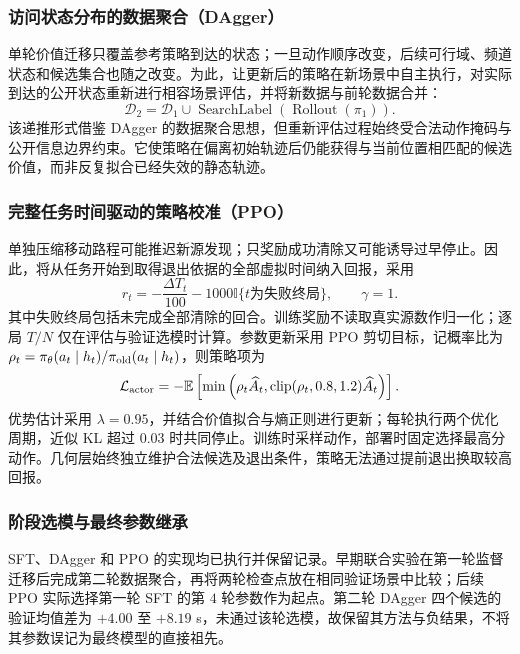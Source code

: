\subsubsection{访问状态分布的数据聚合（DAgger）}
单轮价值迁移只覆盖参考策略到达的状态；一旦动作顺序改变，后续可行域、频道状态和候选集合也随之改变。为此，让更新后的策略在新场景中自主执行，对实际到达的公开状态重新进行相容场景评估，并将新数据与前轮数据合并：
\begin{equation}
  \mathcal D_2=\mathcal D_1\cup
  \operatorname{SearchLabel}\!\left(\operatorname{Rollout}(\pi_1)\right).
\end{equation}
该递推形式借鉴 DAgger 的数据聚合思想\cite{ross2011}，但重新评估过程始终受合法动作掩码与公开信息边界约束。它使策略在偏离初始轨迹后仍能获得与当前位置相匹配的候选价值，而非反复拟合已经失效的静态轨迹。

\subsubsection{完整任务时间驱动的策略校准（PPO）}
单独压缩移动路程可能推迟新源发现；只奖励成功清除又可能诱导过早停止。因此，将从任务开始到取得退出依据的全部虚拟时间纳入回报，采用
\begin{equation}
 r_t=-\frac{\Delta T_t}{100}-1000\mathbb I\{t\text{为失败终局}\},\qquad\gamma=1.
\end{equation}
其中失败终局包括未完成全部清除的回合。训练奖励不读取真实源数作归一化；逐局 $T/N$ 仅在评估与验证选模时计算。参数更新采用 PPO 剪切目标\cite{schulman2017}，记概率比为 $\rho_t=\pi_\theta(a_t\mid h_t)/\pi_{\rm old}(a_t\mid h_t)$，则策略项为
\begin{equation}
 \mathcal L_{\rm actor}=-\mathbb E\left[\min\left(\rho_t\widehat A_t,
 \operatorname{clip}(\rho_t,0.8,1.2)\widehat A_t\right)\right].
\end{equation}
优势估计采用 $\lambda=0.95$，并结合价值拟合与熵正则进行更新；每轮执行两个优化周期，近似 KL 超过 $0.03$ 时共同停止。训练时采样动作，部署时固定选择最高分动作。几何层始终独立维护合法候选及退出条件，策略无法通过提前退出换取较高回报。

\subsubsection{阶段选模与最终参数继承}
SFT、DAgger 和 PPO 的实现均已执行并保留记录。早期联合实验在第一轮监督迁移后完成第二轮数据聚合，再将两轮检查点放在相同验证场景中比较；后续 PPO 实际选择第一轮 SFT 的第 $4$ 轮参数作为起点。第二轮 DAgger 四个候选的验证均值差为 $+4.00$ 至 $+8.19$ s，未通过该轮选模，故保留其方法与负结果，不将其参数误记为最终模型的直接祖先。

